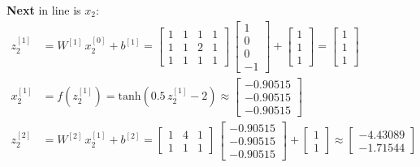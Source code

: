 \documentclass[12pt]{article}
\begin{document}
\begin{enumerate}[leftmargin=\labelsep]
        \vskip -0.2cm
        \textbf{Next} in line is $x_2$:
        \begingroup
        \allowdisplaybreaks
        \begin{align*}
          z^{[1]}_2   & = {W}^{[1]} \, {x}^{[0]}_2 + {b}^{[1]} = \begin{bmatrix} 1 & 1 & 1 & 1 \\ 1 & 1 & 2 & 1 \\ 1 & 1 & 1 & 1\end{bmatrix} \,  \begin{bmatrix} 1 \\ 0 \\ 0 \\ -1 \end{bmatrix} +
          \begin{bmatrix} 1 \\ 1 \\ 1\end{bmatrix} = \begin{bmatrix} 1 \\ 1 \\ 1\end{bmatrix}                                                                                                       \\
          {x}^{[1]}_2 & = f\left({z}^{[1]}_2\right) = \text{tanh}\left(0.5\,{z}^{[1]}_2 - 2\right) \approx \begin{bmatrix} -0.90515 \\ -0.90515 \\ -0.90515\end{bmatrix}                            \\
          z^{[2]}_2   & = {W}^{[2]} \, {x}^{[1]}_2 + {b}^{[2]} = \begin{bmatrix} 1 & 4 & 1 \\ 1 & 1 & 1\end{bmatrix} \,  \begin{bmatrix} -0.90515 \\ -0.90515 \\ -0.90515 \end{bmatrix} +
          \begin{bmatrix} 1 \\ 1\end{bmatrix} \approx \begin{bmatrix} -4.43089 \\ -1.71544\end{bmatrix}                                                                                             \\

\end{align*}
\end{enumerate}
\end{document}
